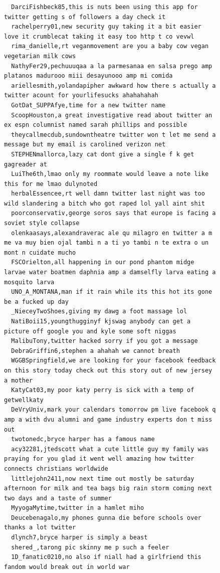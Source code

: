 \begin{figure}[htpb]
\begin{verbatim}
  DarciFishbeck85,this is nuts been using this app for twitter getting s of followers a day check it
  rachelperry01,new security guy taking it a bit easier love it crumblecat taking it easy too http t co vevwl
  rima_danielle,rt veganmovement are you a baby cow vegan vegetarian milk cows
  NathyFer29,pechuuuqaa a la parmesanaa en salsa prego amp platanos madurooo miii desayunooo amp mi comida
  ariellesmith,yolandapipher awkward how there s actually a twitter acount for yourlifesucks ahahahahah
  GotDat_SUPPAfye,time for a new twitter name
  ScoopHouston,a great investigative read about twitter an ex espn columnist named sarah phillips and possible
  theycallmecdub,sundowntheatre twitter won t let me send a message but my email is carolined verizon net
  STEPHENmallorca,lazy cat dont give a single f k get gagreader at
  LuiThe6th,lmao only my roommate would leave a note like this for me lmao dulynoted
  herbalEssencee,rt well damn twitter last night was too wild slandering a bitch who got raped lol yall aint shit
  poorconservativ,george soros says that europe is facing a soviet style collapse
  olenkaasays,alexandraverac ale qu milagro en twitter a m me va muy bien ojal tambi n a ti yo tambi n te extra o un mont n cuidate mucho
  FSCOrielton,all happening in our pond phantom midge larvae water boatmen daphnia amp a damselfly larva eating a mosquito larva
  UNO_A_MONTANA,man if it rain while its this hot its gone be a fucked up day
  _NieceyTwoShoes,giving my dawg a foot massage lol
  NatiBoii15,youngthugginyf kjswag anybody can get a picture off google you and kyle some soft niggas
  MalibuTony,twitter hacked sorry if you got a message
  DebraGriffin6,stephen a ahahah we cannot breath
  WGGBSpringfield,we are looking for your facebook feedback on this story today check out this story out of new jersey a mother
  KatyCat03,my poor katy perry is sick with a temp of getwellkaty
  DeVryUniv,mark your calendars tomorrow pm live facebook q amp a with dvu alumni and game industry experts don t miss out
  twotonedc,bryce harper has a famous name
  acy32281,jtedscott what a cute little guy my family was praying for you glad it went well amazing how twitter connects christians worldwide
  littlejohn2411,now next time out mostly be saturday afternoon for milk and tea bags big rain storm coming next two days and a taste of summer
  MyyogaMytime,twitter in a hamlet miho
  Deucebenagalo,my phones gunna die before schools over thanks a lot twitter
  dlynch7,bryce harper is simply a beast
  shered_,tarong pic skinny me p such a feeler
  1D_fanatic0210,no also if niall had a girlfriend this fandom would break out in world war

\end{verbatim}
\end{figure}

